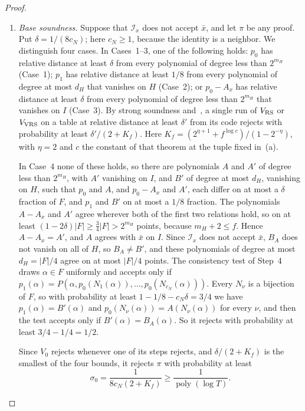 \documentclass[11pt,letterpaper]{article}
\theoremstyle{definition}
\theoremstyle{remark}
\newcommand{\poly}{\operatorname{poly}}
\newcommand{\abs}[1]{\left|#1\right|}
\begin{document}
\begin{proof}
\begin{enumerate}[label=(\alph*)]
accepts \(\pi\) with probability one.
\item \emph{Base soundness.} Suppose that \(\mathcal I_x\) does not
accept \(\bar x\), and let \(\pi\) be any proof. Put
\(\delta=1/(8c_N)\); here \(c_N\ge1\), because the identity is a
neighbor. We distinguish four cases. In Cases~1--3, one of the following
holds: \(p_0\) has relative distance at least \(\delta\) from every
polynomial of degree less than \(2^{m_H}\) (Case~1); \(p_1\) has relative
distance at least \(1/8\) from every polynomial of degree at most \(d_H\)
that vanishes on \(H\) (Case~2); or \(p_0-A_x\) has relative distance at
least \(\delta\) from every polynomial of degree less than \(2^{m_H}\)
that vanishes on \(I\) (Case~3). By strong soundness
\cite[Definition~4.15]{BCGT13} and~\cite[Theorem~11.1]{BCGT13}, a single
run of \(V_{\rm RS}\) or \(V_{\rm VRS}\) on a table at relative distance
at least \(\delta'\) from its code rejects with probability at least
\(\delta'/(2+K_f)\). Here \(K_f=(2^{\eta+1}+f^{\log c})/(1-2^{-\eta})\),
with \(\eta=2\) and \(c\) the constant of that theorem at the tuple fixed
in~(a).

In Case~4 none of these holds, so there are polynomials \(A\) and
\(A'\) of degree less than \(2^{m_H}\), with \(A'\) vanishing on \(I\),
and \(B'\) of degree at most \(d_H\), vanishing on \(H\), such that
\(p_0\) and \(A\), and \(p_0-A_x\) and \(A'\), each differ on at most a
\(\delta\) fraction of \(F\), and \(p_1\) and \(B'\) on at most a
\(1/8\) fraction. The polynomials \(A-A_x\) and \(A'\) agree wherever
both of the first two relations hold, so on at least
\((1-2\delta)\abs F\ge\frac34\abs F>2^{m_H}\) points, because
\(m_H+2\le f\). Hence \(A-A_x=A'\), and \(A\) agrees with \(\bar x\) on
\(I\). Since \(\mathcal I_x\) does not accept \(\bar x\), \(B_A\) does not
vanish on all of \(H\), so \(B_A\ne B'\), and these polynomials of degree
at most \(d_H=\abs F/4\) agree on at most \(\abs F/4\) points. The
consistency test of Step~4 draws \(\alpha\in F\) uniformly and accepts
only if \(p_1(\alpha)=P(\alpha,p_0(N_1(\alpha)),\ldots,
p_0(N_{c_N}(\alpha)))\). Every \(N_\nu\) is a bijection of \(F\), so with
probability at least \(1-1/8-c_N\delta=3/4\) we have
\(p_1(\alpha)=B'(\alpha)\) and \(p_0(N_\nu(\alpha))=A(N_\nu(\alpha))\) for
every \(\nu\), and then the test accepts only if
\(B'(\alpha)=B_A(\alpha)\). So it rejects with probability at least
\(3/4-1/4=1/2\).

Since \(V_0\) rejects whenever one of its steps rejects, and
\(\delta/(2+K_f)\) is the smallest of the four bounds, it rejects \(\pi\)
with probability at least
\[
 \sigma_0=\frac1{8c_N(2+K_f)}\ge\frac1{\poly(\log T)}.
\]
\end{enumerate}


\end{proof}
\end{document}
